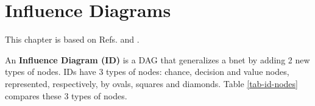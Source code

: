 \chapter{Influence Diagrams}
\label{ch-influ-diag}

This chapter is based on Refs.\cite{sha-influ-diag}
and \cite{limid-one}.


An {\bf Influence Diagram (ID)} is
a DAG that generalizes a bnet by adding
2 new types of nodes. IDs have 3 types of nodes: chance, decision and value nodes, represented, respectively, by ovals, squares and diamonds. Table \ref{tab-id-nodes} compares these 3 types of nodes.

